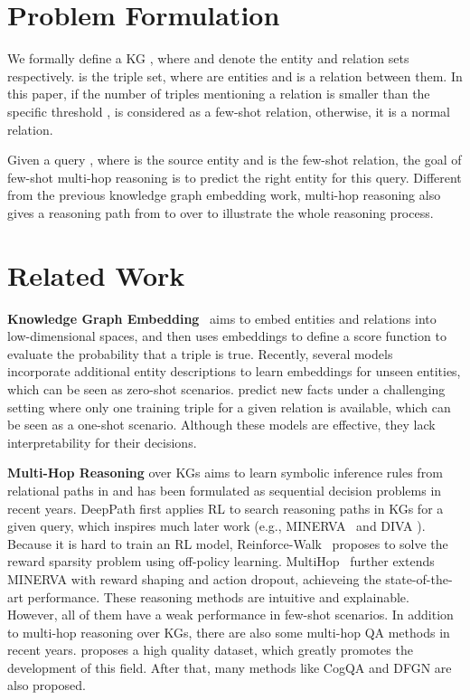 \documentclass[11pt,a4paper]{article}
\begin{document}
\section{Problem Formulation}
\label{problem}

We formally define a KG , where  and  denote the entity and relation sets respectively.  is the triple set, where  are entities and  is a relation between them. In this paper, if the number of triples mentioning a relation  is smaller than the specific threshold ,  is considered as a few-shot relation, otherwise, it is a normal relation.

Given a query , where  is the source entity and  is the few-shot relation, the goal of few-shot multi-hop reasoning is to predict the right entity  for this query. Different from the previous knowledge graph embedding work, multi-hop reasoning also gives a reasoning path from  to  over  to illustrate the whole reasoning process.

\section{Related Work}

\textbf{Knowledge Graph Embedding}~\cite{TransE,DistMult,ConvE} aims to embed entities and relations into low-dimensional spaces, and then uses embeddings to define a score function  to evaluate the probability that a triple is true. Recently, several models~\cite{DKRL,shi2018open} incorporate additional entity descriptions to learn embeddings for unseen entities, which can be seen as zero-shot scenarios. \citet{one-shot} predict new facts under a challenging setting where only one training triple for a given relation  is available, which can be seen as a one-shot scenario. Although these models are effective, they lack interpretability for their decisions.

\textbf{Multi-Hop Reasoning} over KGs aims to learn symbolic inference rules from relational paths in  and has been formulated as sequential decision problems in recent years. DeepPath \cite{DeepPath} first applies RL to search reasoning paths in KGs for a given query, which inspires much later work (e.g., MINERVA~\cite{MINERVA} and DIVA \cite{chen2018variational}). Because it is hard to train an RL model, Reinforce-Walk~\cite{shen2018reinforcewalk} proposes to solve the reward sparsity problem using off-policy learning. MultiHop~\cite{MultiHop} further extends MINERVA with reward shaping and action dropout, 
achieveing the state-of-the-art performance. These reasoning methods are intuitive and explainable. However, all of them have a weak performance in few-shot scenarios. In addition to multi-hop reasoning over KGs, there are also some multi-hop QA methods in recent years. \citet{yang2018hotpotqa} proposes a high quality dataset, which greatly promotes the development of this field. After that, many methods like CogQA \cite{CogQA} and DFGN \cite{DFGN} are also proposed.
\end{document}
